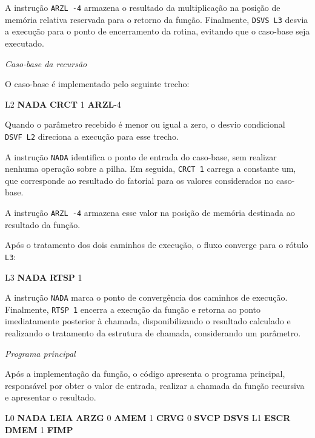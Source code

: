 \documentclass[
  brazilian,
  letterpaper,
]{book}
\newenvironment{Shaded}{\begin{snugshade}}{\end{snugshade}}
\newcommand{\DecValTok}[1]{\textcolor[rgb]{0.68,0.00,0.00}{#1}}
\newcommand{\FunctionTok}[1]{\textcolor[rgb]{0.28,0.35,0.67}{#1}}
\newcommand{\KeywordTok}[1]{\textcolor[rgb]{0.00,0.23,0.31}{\textbf{#1}}}
\newcommand{\NormalTok}[1]{\textcolor[rgb]{0.00,0.23,0.31}{#1}}
\theoremstyle{plain}
\theoremstyle{definition}
\theoremstyle{remark}
\begin{document}
A instrução \texttt{ARZL\ -4} armazena o resultado da multiplicação na
posição de memória relativa reservada para o retorno da função.
Finalmente, \texttt{DSVS\ L3} desvia a execução para o ponto de
encerramento da rotina, evitando que o caso-base seja executado.

\emph{Caso-base da recursão}

O caso-base é implementado pelo seguinte trecho:

\begin{Shaded}
\begin{Highlighting}[]
\FunctionTok{L2}  \KeywordTok{NADA}
    \KeywordTok{CRCT}    \DecValTok{1}
    \KeywordTok{ARZL}\NormalTok{    {-}}\DecValTok{4}
\end{Highlighting}
\end{Shaded}

Quando o parâmetro recebido é menor ou igual a zero, o desvio
condicional \texttt{DSVF\ L2} direciona a execução para esse trecho.

A instrução \texttt{NADA} identifica o ponto de entrada do caso-base,
sem realizar nenhuma operação sobre a pilha. Em seguida,
\texttt{CRCT\ 1} carrega a constante um, que corresponde ao resultado do
fatorial para os valores considerados no caso-base.

A instrução \texttt{ARZL\ -4} armazena esse valor na posição de memória
destinada ao resultado da função.

Após o tratamento dos dois caminhos de execução, o fluxo converge para o
rótulo \texttt{L3}:

\begin{Shaded}
\begin{Highlighting}[]
\FunctionTok{L3}  \KeywordTok{NADA}
    \KeywordTok{RTSP}    \DecValTok{1}
\end{Highlighting}
\end{Shaded}

A instrução \texttt{NADA} marca o ponto de convergência dos caminhos de
execução. Finalmente, \texttt{RTSP\ 1} encerra a execução da função e
retorna ao ponto imediatamente posterior à chamada, disponibilizando o
resultado calculado e realizando o tratamento da estrutura de chamada,
considerando um parâmetro.

\emph{Programa principal}

Após a implementação da função, o código apresenta o programa principal,
responsável por obter o valor de entrada, realizar a chamada da função
recursiva e apresentar o resultado.

\begin{Shaded}
\begin{Highlighting}[]
\FunctionTok{L0}  \KeywordTok{NADA}
    \KeywordTok{LEIA}
    \KeywordTok{ARZG}    \DecValTok{0}
    \KeywordTok{AMEM}    \DecValTok{1}
    \KeywordTok{CRVG}    \DecValTok{0}
    \KeywordTok{SVCP}
    \KeywordTok{DSVS}    \FunctionTok{L1}
    \KeywordTok{ESCR}
    \KeywordTok{DMEM}    \DecValTok{1}
    \KeywordTok{FIMP}
\end{Highlighting}
\end{Shaded}
\end{document}
